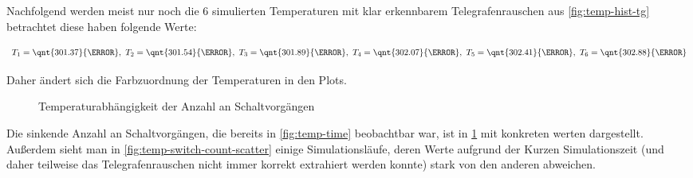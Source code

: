 \documentclass[main.tex]{subfiles}
\begin{document}
Nachfolgend werden meist nur noch die 6 simulierten Temperaturen mit klar erkennbarem Telegrafenrauschen aus \cref{fig:temp-hist-tg} betrachtet diese haben folgende Werte:

\begin{align}
    T_1 = \qnt{301.37}{\kelvin},~
    T_2 = \qnt{301.54}{\kelvin},~
    T_3 = \qnt{301.89}{\kelvin},~
    T_4 = \qnt{302.07}{\kelvin},~
    T_5 = \qnt{302.41}{\kelvin},~
    T_6 = \qnt{302.88}{\kelvin}
\end{align} 

Daher ändert sich die Farbzuordnung der Temperaturen in den Plots.

\begin{figure}[H]
    \centering
    \caption{Temperaturabhängigkeit der Anzahl an Schaltvorgängen}\label{fig:temp-switch-count}
\end{figure}

Die sinkende Anzahl an Schaltvorgängen, die bereits in \cref{fig:temp-time} beobachtbar war,  ist in \cref{fig:temp-switch-count} mit konkreten werten dargestellt. Außerdem sieht man in \cref{fig:temp-switch-count-scatter} einige Simulationsläufe, deren Werte aufgrund der Kurzen Simulationszeit (und daher teilweise das Telegrafenrauschen nicht immer korrekt extrahiert werden konnte) stark von den anderen abweichen.
\end{document}
